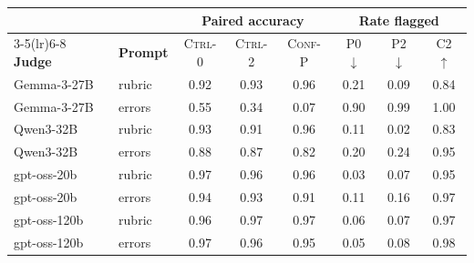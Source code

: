 \begin{tabular}{llcccccc}
\toprule
 & & \multicolumn{3}{c}{\textbf{Paired accuracy}} & \multicolumn{3}{c}{\textbf{Rate flagged}} \\
\cmidrule(lr){3-5}\cmidrule(lr){6-8}
\textbf{Judge} & \textbf{Prompt} & \textsc{Ctrl-0} & \textsc{Ctrl-2} & \textsc{Conf-P} & P0 $\downarrow$ & P2 $\downarrow$ & C2 $\uparrow$ \\
\midrule
Gemma-3-27B & rubric & 0.92 & 0.93 & 0.96 & 0.21 & 0.09 & 0.84 \\
Gemma-3-27B & errors & 0.55 & 0.34 & 0.07 & 0.90 & 0.99 & 1.00 \\
Qwen3-32B & rubric & 0.93 & 0.91 & 0.96 & 0.11 & 0.02 & 0.83 \\
Qwen3-32B & errors & 0.88 & 0.87 & 0.82 & 0.20 & 0.24 & 0.95 \\
gpt-oss-20b & rubric & 0.97 & 0.96 & 0.96 & 0.03 & 0.07 & 0.95 \\
gpt-oss-20b & errors & 0.94 & 0.93 & 0.91 & 0.11 & 0.16 & 0.97 \\
gpt-oss-120b & rubric & 0.96 & 0.97 & 0.97 & 0.06 & 0.07 & 0.97 \\
gpt-oss-120b & errors & 0.97 & 0.96 & 0.95 & 0.05 & 0.08 & 0.98 \\
\bottomrule
\end{tabular}